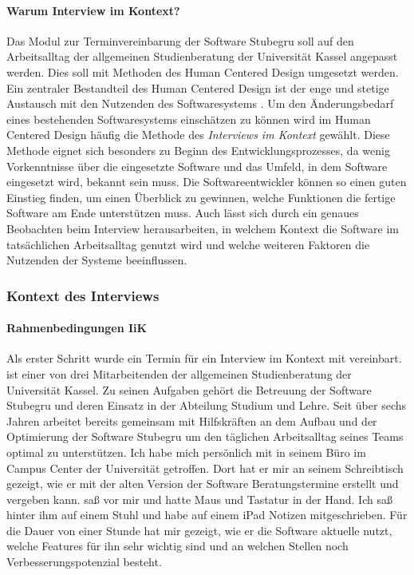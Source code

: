 \paragraph{Warum Interview im Kontext?}
Das Modul zur Terminvereinbarung der Software Stubegru soll auf den
Arbeitsalltag der allgemeinen Studienberatung der Universität Kassel angepasst
werden. Dies soll mit Methoden des Human Centered Design umgesetzt werden. Ein
zentraler Bestandteil des Human Centered Design ist der enge und stetige
Austausch mit den Nutzenden des Softwaresystems \cite{hci}. Um den Änderungsbedarf eines bestehenden Softwaresystems einschätzen
zu können wird im Human Centered Design häufig die Methode des
\textit{Interviews im Kontext} gewählt.\cite{contextualDesign} Diese Methode
eignet sich besonders zu Beginn des Entwicklungsprozesses, da wenig
Vorkenntnisse über die eingesetzte Software und das Umfeld, in dem Software
eingesetzt wird, bekannt sein muss. Die Softwareentwickler können so einen
guten Einstieg finden, um einen Überblick zu gewinnen, welche Funktionen die
fertige Software am Ende unterstützen muss. Auch lässt sich durch ein genaues
Beobachten beim Interview herausarbeiten, in welchem Kontext die Software im
tatsächlichen Arbeitsalltag genutzt wird und welche weiteren Faktoren die
Nutzenden der Systeme beeinflussen.

\subsubsection{Kontext des Interviews}

\paragraph{Rahmenbedingungen IiK}
Als erster Schritt wurde ein Termin für ein Interview im Kontext mit \ipName vereinbart. \ipName ist einer von drei
Mitarbeitenden der allgemeinen Studienberatung der Universität Kassel. Zu
seinen Aufgaben gehört die Betreuung der Software Stubegru und deren Einsatz in
der Abteilung Studium und Lehre. Seit über sechs Jahren arbeitet \ipName
bereits gemeinsam mit Hilfskräften an dem Aufbau und der Optimierung der
Software Stubegru um den täglichen Arbeitsalltag seines Teams optimal zu
unterstützen. Ich habe mich persönlich mit \ipName in seinem Büro im Campus
Center der Universität getroffen. Dort hat er mir an seinem Schreibtisch
gezeigt, wie er mit der alten Version der Software Beratungstermine erstellt
und vergeben kann. \ipName saß vor mir und hatte Maus und Tastatur in der Hand.
Ich saß hinter ihm auf einem Stuhl und habe auf einem iPad Notizen
mitgeschrieben. Für die Dauer von einer Stunde hat \ipName mir gezeigt, wie er
die Software aktuelle nutzt, welche Features für ihn sehr wichtig sind und an
welchen Stellen noch Verbesserungspotenzial besteht.

